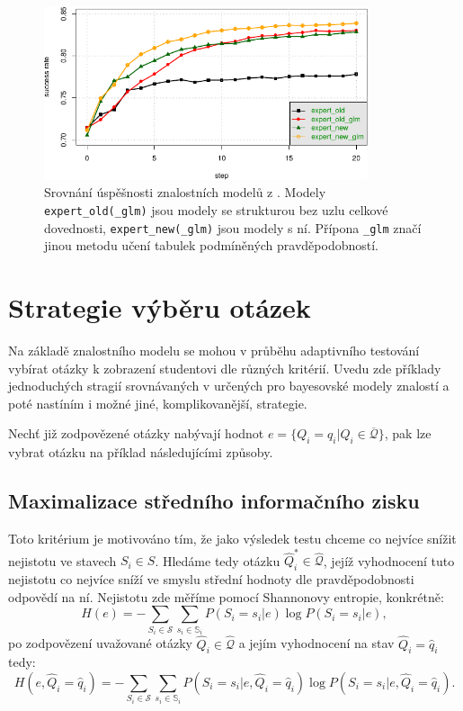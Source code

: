 \documentclass[a4paper,twoside,12pt]{scrbook}
\begin{document}
\begin{figure}
  \centering
    \includegraphics[width=0.85\textwidth]{comparison_chart_plajner16.pdf}
  \caption{Srovnání úspěšnosti znalostních modelů z \cite{plajner16}. Modely \texttt{expert\_old(\_glm)} jsou modely se strukturou bez uzlu celkové dovednosti, \texttt{expert\_new(\_glm)} jsou modely s ní. Přípona \texttt{\_glm} značí jinou metodu učení tabulek podmíněných pravděpodobností.}
  \label{fig:comparison_chart_plajner16}
\end{figure}


\section{Strategie výběru otázek}
\label{sec:question_selection}
Na základě znalostního modelu se mohou v průběhu adaptivního testování vybírat otázky k zobrazení studentovi dle různých kritérií. Uvedu zde příklady jednoduchých  stragií srovnávaných v \cite{question_selection} určených pro bayesovské modely znalostí a poté nastíním i možné jiné, komplikovanější, strategie.

Nechť již zodpovězené otázky nabývají hodnot $e=\{Q_i=q_i|Q_i\in\overline{\mathcal{Q}}\}$, pak lze vybrat otázku na příklad následujícími způsoby.

\subsection{Maximalizace středního informačního zisku}
\label{subsec:information_gain}
Toto kritérium je motivováno tím, že jako výsledek testu chceme co nejvíce snížit nejistotu ve stavech $S_i \in S$. Hledáme tedy otázku $\widehat{Q}^*_i \in \widehat{\mathcal{Q}}$, jejíž vyhodnocení tuto nejistotu co nejvíce sníží ve smyslu střední hodnoty dle pravděpodobnosti odpovědí na ní. Nejistotu zde měříme pomocí Shannonovy entropie, konkrétně:
\begin{equation}
	H(e) = -\sum_{S_i \in \mathcal{S}}\sum_{s_i \in \mathbb{S}_i}P(S_i=s_i|e) \log{}P(S_i=s_i|e),
\end{equation}
po zodpovězení uvažované otázky $\widehat{Q}_i \in \widehat{\mathcal{Q}}$ a jejím vyhodnocení na stav $\widehat{Q}_i = \widehat{q}_i$ tedy:
\begin{equation}
	H(e, \widehat{Q}_i = \widehat{q}_i) = -\sum_{S_i \in \mathcal{S}}\sum_{s_i \in \mathbb{S}_i}P(S_i=s_i|e, \widehat{Q}_i = \widehat{q}_i) \log{}P(S_i=s_i|e, \widehat{Q}_i = \widehat{q}_i).
\end{equation}
\end{document}
